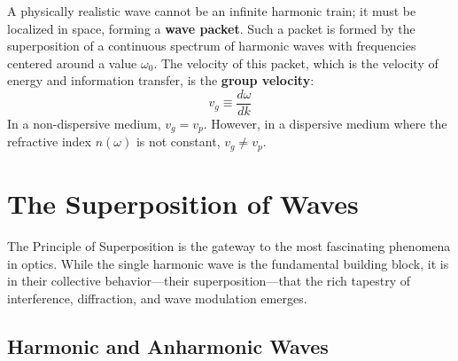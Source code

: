 \begin{definition}
A physically realistic wave cannot be an infinite harmonic train; it must be localized in space, forming a \textbf{wave packet}. Such a packet is formed by the superposition of a continuous spectrum of harmonic waves with frequencies centered around a value $\omega_0$. The velocity of this packet, which is the velocity of energy and information transfer, is the \textbf{group velocity}:
$$ v_g \equiv \frac{d\omega}{dk} $$
In a non-dispersive medium, $v_g = v_p$. However, in a dispersive medium where the refractive index $n(\omega)$ is not constant, $v_g \neq v_p$.
\end{definition}

\section{The Superposition of Waves}

The Principle of Superposition is the gateway to the most fascinating phenomena in optics. While the single harmonic wave is the fundamental building block, it is in their collective behavior—their superposition—that the rich tapestry of interference, diffraction, and wave modulation emerges.

\subsection{Harmonic and Anharmonic Waves}

